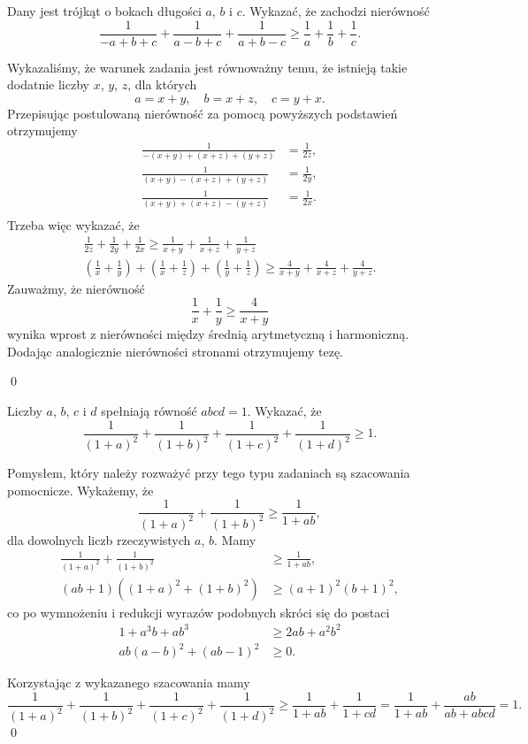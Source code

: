 
\noindent
Dany jest trójkąt o bokach długości $a$, $b$ i $c$. Wykazać, że zachodzi nierówność
\[
	\frac{1}{-a + b + c} + \frac{1}{a - b + c} + \frac{1}{a + b - c} \geqslant \frac{1}{a} + \frac{1}{b} + \frac{1}{c}.
\]


\noindent
Wykazaliśmy, że warunek zadania jest równoważny temu, że istnieją takie dodatnie liczby $x$, $y$, $z$, dla których
\[
	a = x + y, \quad b = x + z, \quad c = y + x.
\]
Przepisując postulowaną nierówność za pomocą powyższych podstawień otrzymujemy
\begin{align*}
	\frac{1}{-(x + y) + (x + z) + (y + z)} &= \frac{1}{2z}, \\
	\frac{1}{(x + y) - (x + z) + (y + z)} &= \frac{1}{2y}, \\
	\frac{1}{(x + y) + (x + z) - (y + z)} &= \frac{1}{2x}. \\
\end{align*}
Trzeba więc wykazać, że
\begin{align*}
	\frac{1}{2z} + \frac{1}{2y} + \frac{1}{2x} \geqslant \frac{1}{x + y} + \frac{1}{x + z} + \frac{1}{y + z} \\
	\left(\frac{1}{x} + \frac{1}{y}\right) + \left(\frac{1}{x} + \frac{1}{z}\right) + \left(\frac{1}{y} + \frac{1}{z}\right) \geqslant \frac{4}{x + y} + \frac{4}{x + z} + \frac{4}{y + z}.
\end{align*}
Zauważmy, że nierówność
\[
	\frac{1}{x} + \frac{1}{y} \geqslant \frac{4}{x + y}
\]
wynika wprost z nierówności między średnią arytmetyczną i harmoniczną. Dodając analogicznie nierówności stronami otrzymujemy tezę.

\qed


\noindent
Liczby $a$, $b$, $c$ i $d$ spełniają równość $abcd = 1$. Wykazać, że
\[
	\frac{1}{(1 + a)^2} + \frac{1}{(1 + b)^2} + \frac{1}{(1 + c)^2} + \frac{1}{(1 + d)^2} \geqslant 1.
\]


\noindent
Pomysłem, który należy rozważyć przy tego typu zadaniach są szacowania pomocnicze. Wykażemy, że
\[
	\frac{1}{(1 + a)^2} + \frac{1}{(1 + b)^2} \geqslant \frac{1}{1 + ab},
\]
dla dowolnych liczb rzeczywistych $a$, $b$. Mamy
\begin{align*}
	\frac{1}{(1 + a)^2} + \frac{1}{(1 + b)^2} &\geqslant \frac{1}{1 + ab}, \\
	(ab + 1)\left( (1 + a)^2 + (1 + b)^2\right) &\geqslant (a + 1)^2(b + 1)^2, 
\end{align*}
co po wymnożeniu i redukcji wyrazów podobnych skróci się do postaci
\begin{align*}
	1 + a^3b + ab^3 &\geqslant 2ab + a^2b^2 \\
	ab(a - b)^2 + (ab - 1)^2 &\geqslant 0.
\end{align*}

\noindent
Korzystając z wykazanego szacowania mamy
\[
	\frac{1}{(1 + a)^2} + \frac{1}{(1 + b)^2} + \frac{1}{(1 + c)^2} + \frac{1}{(1 + d)^2} \geqslant \frac{1}{1 + ab} + \frac{1}{1 + cd} = \frac1{1 + ab} + \frac{ab}{ab + abcd} = 1.
\]
\qed

